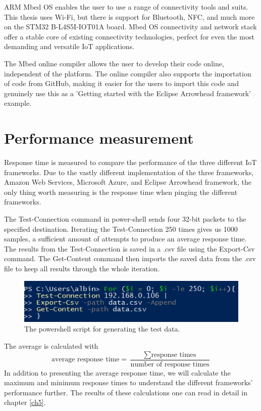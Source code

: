ARM Mbed OS enables the user to use a range of connectivity tools and suits. This thesis uses Wi-Fi, but there is support for Bluetooth, NFC, and much more on the STM32 B-L4S5I-IOT01A board.
Mbed OS connectivity and network stack offer a stable core of existing connectivity technologies, perfect for even the most demanding and versatile IoT applications. 

The Mbed online compiler allows the user to develop their code online, independent of the platform. 
The online compiler also supports the importation of code from GitHub, making it easier for the users to import this code and genuinely use this as a 'Getting started with the Eclipse Arrowhead framework' example. 


\section{Performance measurement}
Response time is measured to compare the performance of the three different IoT frameworks.  
Due to the vastly different implementation of the three frameworks, Amazon Web Services, Microsoft Azure, and Eclipse Arrowhead framework, the only thing worth measuring is the response time when pinging the different frameworks.

The Test-Connection command in power-shell sends four 32-bit packets to the specified destination. 
Iterating the Test-Connection 250 times gives us 1000 samples, a sufficient amount of attempts to produce an average response time.
The results from the Test-Connection is saved in a .csv file using the Export-Csv command. 
The Get-Content command then imports the saved data from the .csv file to keep all results through the whole iteration.
\begin{figure}[H]
    \centering
    \includegraphics[width=\textwidth]{Pictures/powershell.png} 
    \caption{The powershell script for generating the test data.}
    \label{powershell}
\end{figure}

The average is calculated with
\begin{equation*}
    \text{average response time} = \frac{\sum \text{response times}}{\text{number of response times}}
\end{equation*} 
In addition to presenting the average response time, we will calculate the maximum and minimum response times to understand the different frameworks' performance further. 
The results of these calculations one can read in detail in chapter \ref{ch5}.



 
